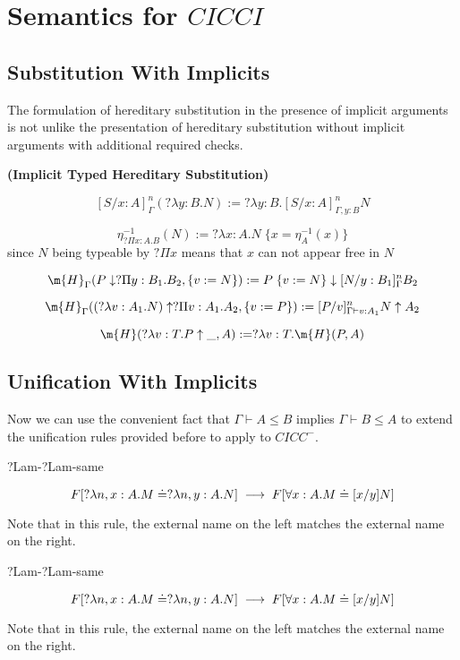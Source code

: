 \section{Semantics for $CICCI$}


\subsection{Substitution With Implicits}

The formulation of hereditary substitution in the presence of 
implicit arguments is not unlike the presentation of
hereditary substitution without implicit arguments with
additional required checks.

\begin{definition}
\textbf{(Implicit Typed Hereditary Substitution)}


\[
[S / x : A]^n_{\Gamma } (?\lambda y : B . N) := ?\lambda y:B . [S / x : A]^n_{\Gamma, y : B} N
\] 

\[
\eta^{-1}_{?\Pi x : A . B}(N) := ?\lambda x : A . N \; \{ x = \eta^{-1}_A(x) \}
\] since $N$ being typeable by $?\Pi x $ means that $x$ can not appear free in $N$

\[
\m{H}_{\Gamma}(P \downarrow ?\Pi y : B_1 . B_2 , \{ v := N \} ) := P\; \{ v := N \} \downarrow [N/y : B_1]^n_{\Gamma}B_2
\]

\[
\m{H}_{\Gamma} ((?\lambda v : A_1 . N) \uparrow ?\Pi v : A_1 . A_2 , \{ v := P \}) 
:= [P/v]^n_{\Gamma \vdash v : A_1} N \uparrow A_2
\]

\[ 
\m{H}(?\lambda v : T . P \uparrow \_ , A) := ?\lambda v : T . \m{H}(P,A)
\]

\label{def:hered}
\end{definition}



\subsection{Unification With Implicits}

Now we can use the convenient fact that $\Gamma \vdash A  \leq B$ implies $\Gamma \vdash B \leq A$ to 
extend the unification rules provided before to apply to $CICC^-$.

\setcounter{tcase}{0}

\begin{tcase}
?Lam-?Lam-same
\end{tcase}


\[
F[?\lambda n,x : A . M \doteq ?\lambda n,y : A . N ]
\;\longrightarrow\;
F[ \forall x : A . M \doteq [x/y]N ]
\]

Note that in this rule, the external name on the left matches the external name on the right.


\begin{tcase}
?Lam-?Lam-same
\end{tcase}


\[
F[?\lambda n,x : A . M \doteq ?\lambda n,y : A . N ]
\;\longrightarrow\;
F[ \forall x : A . M \doteq [x/y]N ]
\]

Note that in this rule, the external name on the left matches the external name on the right.
